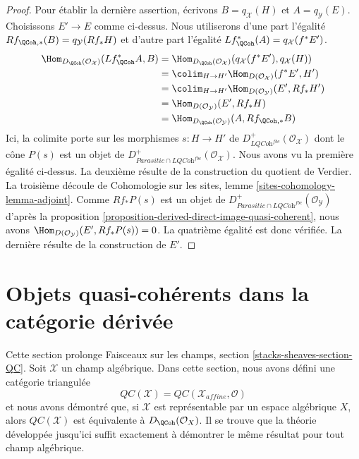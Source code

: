 \begin{proof}
\medskip\noindent
Pour établir la dernière assertion, écrivons $B = q_\mathcal{X}(H)$ et
$A = q_\mathcal{Y}(E)$. Choisissons $E' \to E$ comme ci-dessus. Nous
utiliserons d'une part l'égalité
$Rf_{\QCoh, *}(B) = q_\mathcal{Y}(Rf_*H)$
et d'autre part l'égalité
$Lf^*_\QCoh(A) = q_\mathcal{X}(f^*E')$.
\begin{align*}
\Hom_{D_\QCoh(\mathcal{O}_\mathcal{X})}(Lf^*_\QCoh A, B)
& = 
\Hom_{D_\QCoh(\mathcal{O}_\mathcal{X})}(q_\mathcal{X}(f^*E'),
q_\mathcal{X}(H)) \\
& = 
\colim_{H \to H'} \Hom_{D(\mathcal{O}_\mathcal{X})}(f^*E', H') \\
& = \colim_{H \to H'} \Hom_{D(\mathcal{O}_\mathcal{Y})}(E', Rf_*H') \\
& = \Hom_{D(\mathcal{O}_\mathcal{Y})}(E', Rf_*H) \\
& =
\Hom_{D_\QCoh(\mathcal{O}_\mathcal{Y})}(A, Rf_{\QCoh, *}B)
\end{align*}
Ici, la colimite porte sur les morphismes $s : H \to H'$ de
$D^+_{\textit{LQCoh}^{fbc}}(\mathcal{O}_\mathcal{X})$
dont le cône $P(s)$ est un objet de
$D^+_{\textit{Parasitic} \cap \textit{LQCoh}^{fbc}}(\mathcal{O}_\mathcal{X})$.
Nous avons vu la première égalité ci-dessus. La deuxième résulte de la
construction du quotient de Verdier. La troisième découle de Cohomologie sur
les sites, lemme \ref{sites-cohomology-lemma-adjoint}. Comme $Rf_*P(s)$ est un
objet de
$D^+_{\textit{Parasitic} \cap \textit{LQCoh}^{fbc}}(\mathcal{O}_\mathcal{Y})$
d'après la proposition
\ref{proposition-derived-direct-image-quasi-coherent}, nous avons
$\Hom_{D(\mathcal{O}_\mathcal{Y})}(E', Rf_*P(s)) = 0$. La quatrième égalité est
donc vérifiée. La dernière résulte de la construction de $E'$.
\end{proof}








\section{Objets quasi-cohérents dans la catégorie dérivée}
\label{section-QC}

\noindent
Cette section prolonge Faisceaux sur les champs, section
\ref{stacks-sheaves-section-QC}. Soit $\mathcal{X}$ un champ algébrique. Dans
cette section, nous avons défini une catégorie triangulée
$$
\mathit{QC}(\mathcal{X}) = \mathit{QC}(\mathcal{X}_{affine}, \mathcal{O})
$$
et nous avons démontré que, si $\mathcal{X}$ est représentable par un espace
algébrique $X$, alors $\mathit{QC}(\mathcal{X})$ est équivalente à
$D_\QCoh(\mathcal{O}_X)$. Il se trouve que la théorie développée jusqu'ici
suffit exactement à démontrer le même résultat pour tout champ algébrique.

